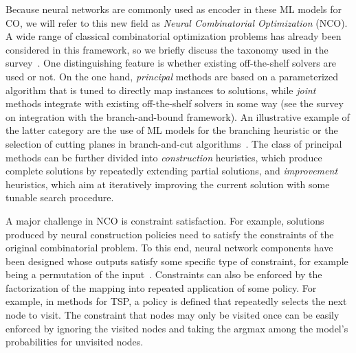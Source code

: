 \documentclass{article}
\theoremstyle{definition}
\theoremstyle{plain}
\begin{document}
Because neural networks are commonly used as encoder in these ML models for CO,
we will refer to this new field as \textit{Neural Combinatorial Optimization} (NCO).
%
A wide range of classical combinatorial optimization problems has already been
considered in this framework, so we briefly discuss the taxonomy used in the
survey~\cite{mazyavkinaReinforcementLearningCombinatorial2020}.
One distinguishing feature is whether existing off-the-shelf solvers are used or
not. On the one hand, \textit{principal} methods are based on a parameterized algorithm
that is tuned to directly map instances to solutions, while \textit{joint} methods
integrate with existing off-the-shelf solvers in some way (see the
survey~\cite{lodiLearningBranchingSurvey2017} on integration with the
branch-and-bound framework). An illustrative example of the latter category are
the use of ML models for the branching heuristic or the selection of cutting
planes in branch-and-cut algorithms~\cite{tangReinforcementLearningInteger2020}.
The class of principal methods can be further divided into \textit{construction}
heuristics, which produce complete solutions by repeatedly extending partial
solutions, and \textit{improvement} heuristics, which aim at iteratively improving the
current solution with some tunable search procedure.




A major challenge in NCO is constraint
satisfaction. For example, solutions produced by neural construction policies
need to satisfy the constraints of the original combinatorial problem.
To this
end, neural network components have been designed whose outputs satisfy some
specific type of constraint, for example being a permutation of the
input~\cite{vinyalsPointerNetworks2017a}. Constraints can also be enforced by
the factorization of the mapping into repeated application of some policy. For
example, in methods for TSP, a policy is defined that repeatedly selects the
next node to visit. The constraint that nodes may only be visited once can be
easily enforced by ignoring the visited nodes and taking the argmax among the
model's probabilities for unvisited nodes.
\end{document}
